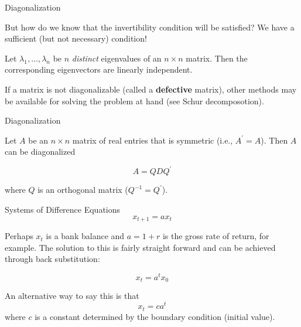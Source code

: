 \documentclass[11pt, xcolor={dvipsnames}, hyperref={colorlinks, allcolors=Blue}]{beamer}
\newcommand\bc[1]{{\usebeamercolor[fg]{frametitle} {\textbf{#1}}}} %
\begin{document}
\begin{frame}{Diagonalization}

But how do we know that the invertibility condition will be satisfied? We have a sufficient (but not necessary) condition!

\bigskip

\begin{theorem}
Let $\lambda_1,\dots,\lambda_n$ be $n$ \emph{distinct} eigenvalues of an $n\times n$ matrix. Then the corresponding eigenvectors are linearly independent.
\end{theorem}

\bigskip

If a matrix is not diagonalizable (called a \bc{defective} matrix), other methods may be available for solving the problem at hand (see Schur decomposotion).
\end{frame}
\begin{frame}{Diagonalization}
\begin{theorem}
Let $A$ be an $n\times n$ matrix of real entries that is symmetric (i.e., $A^{\prime} = A$). Then $A$ can be diagonalized 

\[A = Q D Q^{\prime}\]

where $Q$ is an orthogonal matrix ($Q^{-1} = Q^{\prime}$).
\end{theorem}
\end{frame}
\begin{frame}{Systems of Difference Equations}
\[ x_{t+1} = a x_{t}\]

Perhaps $x_t$ is a bank balance and $a = 1+ r$ is the gross rate of return, for example. The solution to this is fairly straight forward and can be achieved through back substitution:

\[x_t = a^t x_0\]


An alternative way to say this is that 
\[x_t = c a^t\]
where $c$ is a constant determined by the boundary condition (initial value).

\end{frame}
\end{document}

